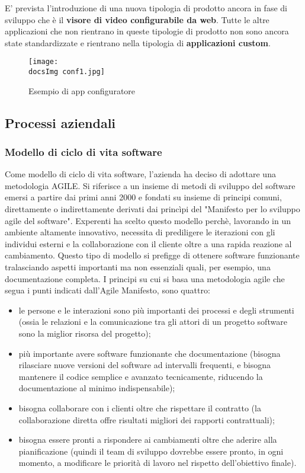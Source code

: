 E' prevista l'introduzione di una nuova tipologia di prodotto ancora in fase di sviluppo che \`e il \textbf{visore di video configurabile da web}. Tutte le altre applicazioni che non rientrano in queste tipologie di prodotto non sono ancora state standardizzate e rientrano nella tipologia di \textbf{applicazioni custom}. 

\begin{figure}[H]
	\centering
	\texttt{[image: \\docsImg conf1.jpg]}
	\caption{Esempio di app configuratore}
	\label{fig:Esempio di app configuratore}
\end{figure}



\subsection{Processi aziendali}
\subsubsection{Modello di ciclo di vita software}
Come modello di ciclo di vita software, l'azienda ha deciso di adottare una metodologia AGILE. Si riferisce a un insieme di metodi di sviluppo del software emersi a partire dai primi anni 2000 e fondati su insieme di principi comuni, direttamente o indirettamente derivati dai princìpi del "Manifesto per lo sviluppo agile del software". Experenti ha scelto questo modello perch\`e, lavorando in un ambiente altamente innovativo, necessita di prediligere le iterazioni con gli individui esterni e la collaborazione con il cliente oltre a una rapida reazione al cambiamento. Questo tipo di modello si prefigge di ottenere software funzionante tralasciando aspetti importanti ma non essenziali quali, per esempio, una documentazione completa.
I principi su cui si basa una metodologia agile che segua i punti indicati dall'Agile Manifesto, sono quattro:
\begin{itemize}
	\item le persone e le interazioni sono più importanti dei processi e degli strumenti (ossia le relazioni e la comunicazione tra gli attori di un progetto software sono la miglior risorsa del progetto);
	\item  più importante avere software funzionante che documentazione (bisogna rilasciare nuove versioni del software ad intervalli frequenti, e bisogna mantenere il codice semplice e avanzato tecnicamente, riducendo la documentazione al minimo indispensabile);
	\item bisogna collaborare con i clienti oltre che rispettare il contratto (la collaborazione diretta offre risultati migliori dei rapporti contrattuali);
	\item bisogna essere pronti a rispondere ai cambiamenti oltre che aderire alla pianificazione (quindi il team di sviluppo dovrebbe essere pronto, in ogni momento, a modificare le priorità di lavoro nel rispetto dell'obiettivo finale).
\end{itemize}

